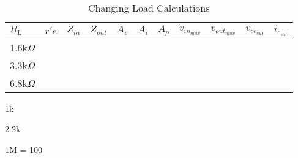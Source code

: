 \documentclass[main.tex]{subfiles}
\begin{document}
\begin{centering}
  \begin{table}[h]
    \caption{Changing Load Calculations}
    \begin{tabularx}{\textwidth}{|X|X|X|X|X|X|X|X|X|X|X|}
      \hline
      $R_{\text{L}}$ & $r'e$ & $Z_{in}$ & $Z_{out}$ & $A_{v}$ & $A_{i}$ & $A_{p}$ & $v_{in_{max}}$ & $v_{out_{max}}$ & $v_{ce_{cut}}$ & $i_{c_{sat}}$ \\
      \hline
      1.6k$\Omega$ & & & & & & & & & & \\
      \hline
      3.3k$\Omega$ & & & & & & & & & & \\
      \hline
      6.8k$\Omega$ & & & & & & & & & & \\
      \hline
    \end{tabularx}
  \end{table}
\end{centering}
1k\ohm


2.2k\ohm


1M\ohm
\beta = 100
\end{document}
